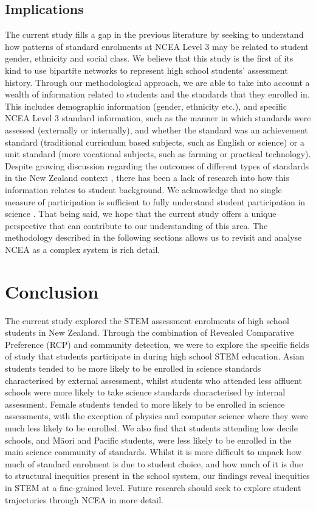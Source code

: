 \subsection{Implications}
The current study fills a gap in the previous literature by seeking to understand how patterns of standard enrolments at NCEA Level 3 may be related to student gender, ethnicity and social class. We believe that this study is the first of its kind to use bipartite networks to represent high school students' assessment history. Through our methodological approach, we are able to take into account a wealth of information related to students and the standards that they enrolled in. This includes demographic information (gender, ethnicity etc.), and specific NCEA Level 3 standard information, such as the manner in which standards were assessed (externally or internally), and whether the standard was an achievement standard (traditional curriculum based subjects, such as English or science) or a unit standard (more vocational subjects, such as farming or practical technology). Despite growing discussion regarding the outcomes of different types of standards in the New Zealand context \citep{hipkins2016ncea,Lipson2017}, there has been a lack of research into how this information relates to student background. We acknowledge that no single measure of participation is sufficient to fully understand student participation in science \citep{hipkins2005staying}. That being said, we hope that the current study offers a unique perspective that can contribute to our understanding of this area. The methodology described in the following sections allows us to revisit and analyse NCEA as a complex system is rich detail. 


\section{Conclusion}
The current study explored the STEM assessment enrolments of high school students in New Zealand. Through the combination of Revealed Comparative Preference (RCP) and community detection, we were to explore the specific fields of study that students participate in during high school STEM education. Asian students tended to be more likely to be enrolled in science standards characterised by external assessment, whilst students who attended less affluent schools were more likely to take science standards characterised by internal assessment. Female students tended to more likely to be enrolled in science assessments, with the exception of physics and computer science where they were much less likely to be enrolled. We also find that students attending low decile schools, and M\={a}ori and Pacific students, were less likely to be enrolled in the main science community of standards. Whilst it is more difficult to unpack how much of standard enrolment is due to student choice, and how much of it is due to structural inequities present in the school system, our findings reveal inequities in STEM at a fine-grained level. Future research should seek to explore student trajectories through NCEA in more detail.



